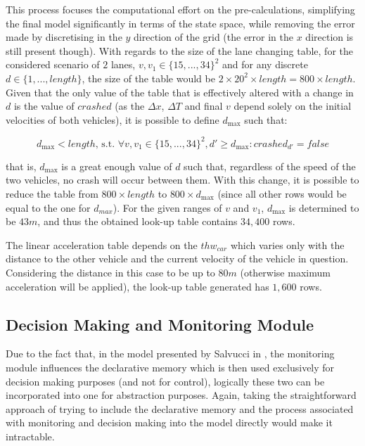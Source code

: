 This process focuses the computational effort on the pre-calculations, simplifying the final model significantly in terms of the state space, while removing the error made by discretising in the $y$ direction of the grid (the error in the $x$ direction is still present though). With regards to the size of the lane changing table, for the considered scenario of $2$ lanes, $v, v_1 \in \{15,...,34\}^2$ and for any discrete $d \in \{1,...,length\}$, the size of the table would be $2\times 20^2 \times length = 800 \times length$. Given that the only value of the table that is effectively altered with a change in $d$ is the value of $crashed$ (as the $\Delta x$, $\Delta T$ and final $v$ depend solely on the initial velocities of both vehicles), it is possible to define $d_{\max}$ such that:

\begin{equation}
d_{\max} < length\text{, s.t. }\forall v, v_1 \in \{15,...,34\}^2, d' \geq d_{\max}: crashed_{d'} = false
\end{equation}

that is, $d_{\max}$ is a great enough value of $d$ such that, regardless of the speed of the two vehicles, no crash will occur between them. With this change, it is possible to reduce the table from $800\times length$ to $800\times d_{\max}$ (since all other rows would be equal to the one for $d_{max}$). For the given ranges of $v$ and $v_1$, $d_{\max}$ is determined to be $43m$, and thus the obtained look-up table contains $34,400$ rows.

The linear acceleration table depends on the $thw_{car}$ which varies only with the distance to the other vehicle and the current velocity of the vehicle in question. Considering the distance in this case to be up to $80m$ (otherwise maximum acceleration will be applied), the look-up table generated has $1,600$ rows.

\subsection{Decision Making and Monitoring Module}

Due to the fact that, in the model presented by Salvucci in \cite{salvucci_1}, the monitoring module influences the declarative memory which is then used exclusively for decision making purposes (and not for control), logically these two can be incorporated into one for abstraction purposes. Again, taking the straightforward approach of trying to include the declarative memory and the process associated with monitoring and decision making into the model directly would make it intractable. 

